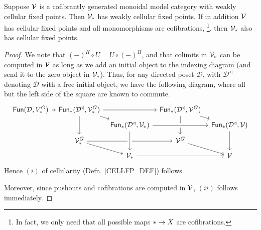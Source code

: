 \documentclass[a4paper,10pt
,draft
]{article}%
\renewcommand{\1}{\eta}%
\begin{document}
\begin{lemma}
      \label{PT_CELL_LEM}
      Suppose $\mathcal V$ is a  cofibrantly generated monoidal model category with weakly cellular fixed points.
      Then $\V_{\**}$ has weakly cellular fixed points.
      If in addition $\mathcal V$ has cellular fixed points and all monomorphisms are cofibrations,
      \footnote{
        In fact, we only need that all possible maps $\** \to X$ are cofibrations.
      }.
      then $\V_{\**}$ also has cellular fixed points.
  \end{lemma}
  \begin{proof}
        We note that $(-)^H \circ U = U \circ (-)^H$,
        and that colimits in $\V_{\**}$ can be computed in $\mathcal V$ as long as we add an initial object to the indexing diagram (and send it to the zero object in $\V_{\**}$).
        Thus, for any directed poset $\mathcal D$, with $\mathcal D^\triangleleft$ denoting $\mathcal D$ with a free initial object,
        we have the following diagram, where all but the left side of the square are known to commute.
        \begin{equation}
              \begin{tikzcd}[row sep = tiny, column sep = tiny]
                    \Fun(\mathcal D, V^G_{\**}) \arrow[r]
                    &
                    \Fun_{\**}(\mathcal D^\triangleleft, \V^G_{\**}) \arrow[rr] \arrow[dd] \arrow[dr]
                    &&
                    \Fun_{\**}(\mathcal D^\triangleleft, \V^G) \arrow[dd] \arrow[dr]
                    \\
                    &&
                    \Fun_{\**}(\mathcal D^\triangleleft, \V_{\**}) \arrow[rr, crossing over]
                    &&
                    \Fun_{\**}(\mathcal D^\triangleleft, \V) \arrow[dd]
                    \\
                    &
                    \V^G_{\**} \arrow[rr] \arrow[dr]
                    &&
                    \V^G \arrow[dr]
                    \\
                    &&
                    \V_{\**} \arrow[rr] \arrow[uu, leftarrow, crossing over]
                    &&
                    \V
              \end{tikzcd}
        \end{equation}
        Hence $(i)$ of cellularity (Defn. \ref{CELLFP_DEF}) follows.
        
        Moreover, since pushouts and cofibrations are computed in $\mathcal V$, $(ii)$ follows immediately.
        

\end{proof}
\end{document}
